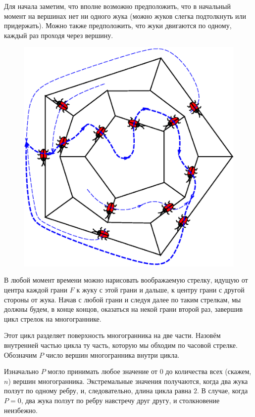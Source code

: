 \medskip

Для начала заметим, что вполне возможно предположить, что в начальный момент на вершинах нет ни одного жука (можно жуков слегка подтолкнуть или придержать).
Можно также предположить, что жуки двигаются по одному, каждый раз проходя через вершину.

\begin{figure}
\centering
\includegraphics[scale=0.5]{Figs/Algorithms/dodec}
\end{figure}

В любой момент времени можно нарисовать воображаемую стрелку, идущую от центра каждой грани $F$ к жуку с этой грани и дальше, к центру грани с другой стороны от жука.
Начав с любой грани и следуя далее по таким стрелкам, мы должны будем, в конце концов, оказаться на некой грани второй раз, завершив цикл стрелок на многограннике.

Этот цикл разделяет поверхность многогранника на две части.
Назовём внутренней частью цикла ту часть, которую мы обходим по часовой стрелке.
Обозначим $P$ число вершин многогранника внутри цикла.

Изначально $P$ могло принимать любое значение от $0$ до количества всех (скажем, $n$) вершин многогранника.
Экстремальные значения получаются, когда два жука ползут по одному ребру, и, следовательно, длина цикла равна $2$.
В случае, когда $P=0$, два жука ползут по ребру навстречу друг другу, и столкновение неизбежно.

